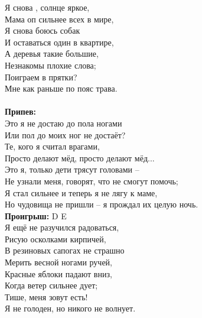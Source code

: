 \documentclass[fleqn,a5paper,12pt,twoside]{guitartabs}
\newcommand{\musSharp}{\texttt{\#}}
\newcommand{\musVspace}{\vspace{2mm}}
\begin{document}
    Я снова \CHORD{F\musSharp{}m}{маленький}, солнце яркое,\\
    Мама оп сильнее всех в мире,\\
    Я с\CHORD{F\musSharp{}m}{}нова боюсь собак\\
    И остав\E{}аться один в квартире,\\
    А де\Hm{}ревья такие большие,\\
    Незнак\D{}омы плохие слова;\\
    Поиграем в п\CHORD{F\musSharp{}m}{}рятки?\\
    Мне как р\E{}аньше по пояс трава.\\
    \\
    \-\hspace{10mm}\textbf{Припев:}\\
    \-\hspace{10mm}Это \D{}я не доста\E{}ю до пола но\CHORD{F\musSharp{}m}{}гами\\
    \-\hspace{10mm}Или пол до моих ног не достаёт?\\
    \-\hspace{10mm}Те, кого я считал врагами,\\
    \-\hspace{10mm}Просто делают мёд, просто делают мёд...\\
    \-\hspace{10mm}Это я, только дети трясут головами --\\
    \-\hspace{10mm}Не узнали меня, говорят, что не смогут помочь;\\
    \-\hspace{10mm}Я стал сильнее и теперь я не лягу к маме,\\
    \-\hspace{10mm}Но чудовища не пришли -- я прождал их целую ночь.\musVspace\\
    \-\hspace{10mm}\textbf{Проигрыш:} D E\\
\newpage
    Я ещё не разучился радоваться,\\
    Рисую осколками кирпичей,\\
    В резиновых сапогах не страшно\\
    Мерить весной ногами ручей,\\
    Красные яблоки падают вниз,\\
    Когда ветер сильнее дует;\\
    Тише, меня зовут есть!\\
    Я не голоден, но никого не волнует.\\
    
\end{document}
